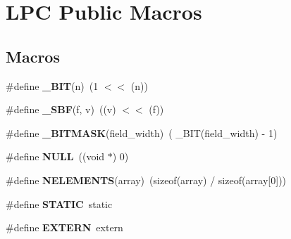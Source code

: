 \hypertarget{group___l_p_c___types___public___macros}{\section{L\+P\+C Public Macros}
\label{group___l_p_c___types___public___macros}
}
\subsection*{Macros}
\begin{DoxyCompactItemize}
\item 
\hypertarget{group___l_p_c___types___public___macros_ga7ee022f5e5a971a8324e4b7572d49170}{\#define {\bfseries \+\_\+\+B\+I\+T}(n)~(1 $<$$<$ (n))}\label{group___l_p_c___types___public___macros_ga7ee022f5e5a971a8324e4b7572d49170}

\item 
\hypertarget{group___l_p_c___types___public___macros_ga6caca3483c2ce446900be05ea02e8f49}{\#define {\bfseries \+\_\+\+S\+B\+F}(f, v)~((v) $<$$<$ (f))}\label{group___l_p_c___types___public___macros_ga6caca3483c2ce446900be05ea02e8f49}

\item 
\hypertarget{group___l_p_c___types___public___macros_ga78ad3421dde54769e8b46d36819ae87a}{\#define {\bfseries \+\_\+\+B\+I\+T\+M\+A\+S\+K}(field\+\_\+width)~( \+\_\+\+B\+I\+T(field\+\_\+width) -\/ 1)}\label{group___l_p_c___types___public___macros_ga78ad3421dde54769e8b46d36819ae87a}

\item 
\hypertarget{group___l_p_c___types___public___macros_ga070d2ce7b6bb7e5c05602aa8c308d0c4}{\#define {\bfseries N\+U\+L\+L}~((void $\ast$) 0)}\label{group___l_p_c___types___public___macros_ga070d2ce7b6bb7e5c05602aa8c308d0c4}

\item 
\hypertarget{group___l_p_c___types___public___macros_gafdd9296176e56fcfd83c07d345a045a7}{\#define {\bfseries N\+E\+L\+E\+M\+E\+N\+T\+S}(array)~(sizeof(array) / sizeof(array\mbox{[}0\mbox{]}))}\label{group___l_p_c___types___public___macros_gafdd9296176e56fcfd83c07d345a045a7}

\item 
\hypertarget{group___l_p_c___types___public___macros_ga10b2d890d871e1489bb02b7e70d9bdfb}{\#define {\bfseries S\+T\+A\+T\+I\+C}~static}\label{group___l_p_c___types___public___macros_ga10b2d890d871e1489bb02b7e70d9bdfb}

\item 
\hypertarget{group___l_p_c___types___public___macros_ga77366c1bd428629dc898e188bfd182a3}{\#define {\bfseries E\+X\+T\+E\+R\+N}~extern}\label{group___l_p_c___types___public___macros_ga77366c1bd428629dc898e188bfd182a3}


\end{DoxyCompactItemize}
